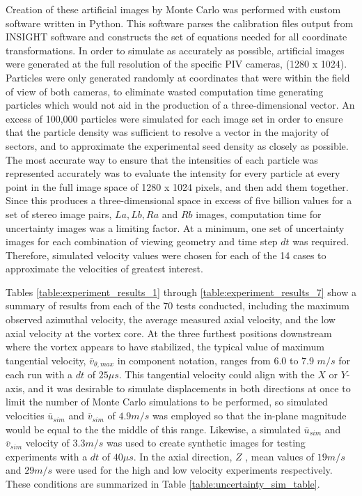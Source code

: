 Creation of these artificial images by Monte Carlo was performed with custom 
software written in Python\texttrademark. This software parses the calibration 
files output 
from INSIGHT software and constructs the set of equations needed for all 
coordinate transformations. In order to simulate as accurately as possible, 
artificial images were generated at the full resolution of the specific PIV 
cameras, (1280 x 1024). Particles were only generated randomly at coordinates 
that were within the field of view of both cameras, to eliminate wasted 
computation time generating particles which would not aid in the production of 
a three-dimensional vector. An excess of 100,000 particles were simulated for 
each image set in order to ensure that the particle density was sufficient to 
resolve a vector in the majority of sectors, and to approximate the 
experimental seed density as closely as possible. The most accurate way to 
ensure that the intensities of each particle was represented accurately was to 
evaluate the intensity for every particle at every point in the full image 
space of 1280 x 1024 pixels, and then add them together. Since this produces a 
three-dimensional space in excess 
of five billion values for a set of stereo image pairs, $La, Lb, Ra$ and $Rb$ 
images, computation time for uncertainty images was a limiting factor. At a 
minimum, one set of uncertainty images for each combination of viewing geometry 
and time step $dt$ was required. Therefore, simulated velocity values were 
chosen for each of the 14 cases to approximate the velocities of greatest 
interest. 

Tables \ref{table:experiment_results_1} through 
\ref{table:experiment_results_7} show a summary of results from each of the 70 
tests conducted, including the maximum 
observed azimuthal velocity, the average measured axial velocity, and the low 
axial velocity at the vortex core. At the three furthest positions downstream 
where the vortex appears to have stabilized, the typical value of maximum 
tangential velocity, $\overline{v}_{\theta,max}$ in component notation, ranges 
from 6.0 to 7.9 $m/s$ for each run with a $dt$ of $25 \mu s$. This tangential 
velocity could align with the $X$ or $Y$-axis, and 
it was desirable to simulate displacements in both directions at once to limit 
the number of Monte Carlo simulations to be performed, so simulated velocities
$\overline{u}_{sim}$ and $\overline{v}_{sim}$
of $4.9 m/s$ was employed so that the in-plane magnitude would be equal 
to the the middle of this range. Likewise, a simulated $\overline{u}_{sim}$ and 
$\overline{v}_{sim}$  velocity of 
$3.3 m/s$ was used to create synthetic images for testing experiments with a 
$dt$ of $40 \mu s$. In the axial direction, $Z$ , mean values of $19 m/s$ and 
$29 
m/s$ were used for the high and low velocity experiments respectively. These 
conditions are summarized in Table \ref{table:uncertainty_sim_table}.

